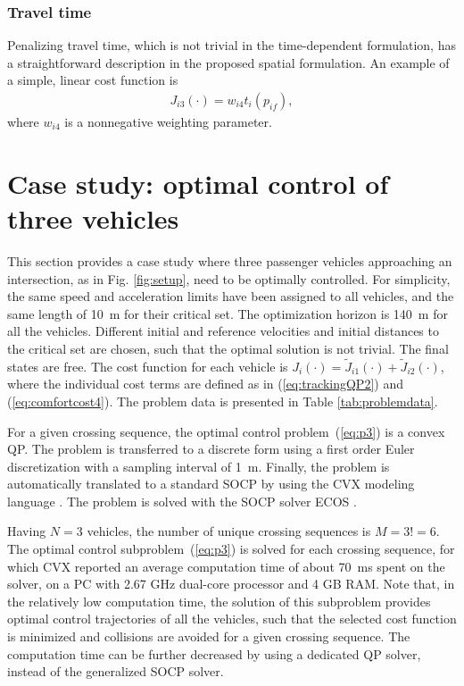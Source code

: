 \documentclass[letterpaper,10pt,conference]{ieeeconf}
\begin{document}
\subsubsection{Travel time} Penalizing travel time, which is not trivial in the time-dependent formulation, has a straightforward  description in the proposed spatial formulation. An example of a simple, linear cost function is
\begin{align}
J_{i3}(\cdot) = w_{i4} t_i(p_{if}),
\end{align}
where $w_{i4}$ is a nonnegative weighting parameter.

\section{Case study: optimal control of three vehicles} \label{sec:casestudy}

This section provides a case study where three passenger vehicles approaching an intersection, as in Fig. \ref{fig:setup}, need to be optimally controlled. For simplicity, the same speed and acceleration limits have been assigned to all vehicles, and the same length of \SI{10}{m} for their critical set. The optimization horizon is \SI{140}{m} for all the vehicles. Different initial and reference velocities and initial distances to the critical set are chosen, such that the optimal solution is not trivial. The final states are free. The cost function for each vehicle is \mbox{$J_i(\cdot)=\tilde J_{i1}(\cdot)+\tilde J_{i2}(\cdot)$}, where the individual cost terms are  defined  as in (\ref{eq:trackingQP2}) and (\ref{eq:comfortcost4}). The problem data is presented in Table \ref{tab:problemdata}.

For a given crossing sequence, the optimal control problem~(\ref{eq:p3}) is a convex QP. The problem is transferred to a discrete form using a first order Euler discretization with a sampling interval of \SI{1}{m}. Finally, the problem is automatically translated to a standard SOCP by using the CVX modeling language \cite{cvx12,grant08}. The problem is solved with the SOCP solver ECOS \cite{ecos}.

Having $N=3$ vehicles, the number of unique crossing sequences is $M=3!=6$. The optimal control subproblem~(\ref{eq:p3}) is solved for each crossing sequence, for which CVX reported an average computation time of about \SI{70}{ms} spent on the solver, on a PC with 2.67 GHz dual-core processor and 4 GB RAM. Note that, in the relatively low computation time, the solution of this subproblem provides  optimal control trajectories of all the vehicles, such that the selected cost function is minimized and collisions are avoided for a given crossing sequence. The computation time can be further decreased by using a dedicated QP solver, instead of the generalized SOCP solver.
\end{document}
